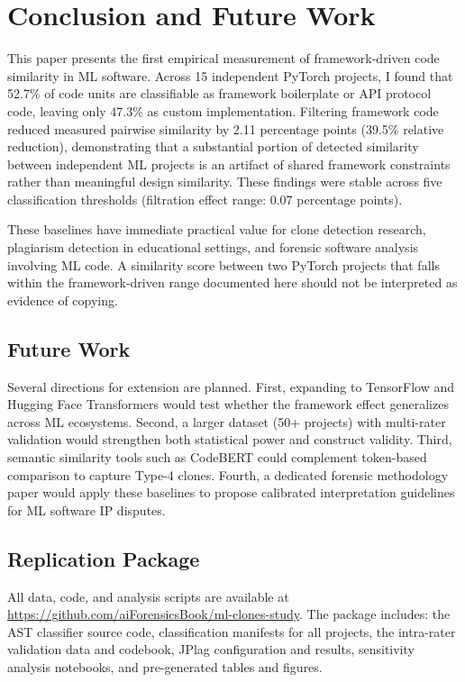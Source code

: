 \documentclass[smallextended,natbib]{svjour3}
\begin{document}
\section{Conclusion and Future Work}
\label{sec:conclusion}

This paper presents the first empirical measurement of framework-driven code similarity in ML software. Across 15 independent PyTorch projects, I found that 52.7\% of code units are classifiable as framework boilerplate or API protocol code, leaving only 47.3\% as custom implementation. Filtering framework code reduced measured pairwise similarity by 2.11 percentage points (39.5\% relative reduction), demonstrating that a substantial portion of detected similarity between independent ML projects is an artifact of shared framework constraints rather than meaningful design similarity. These findings were stable across five classification thresholds (filtration effect range: 0.07 percentage points).

These baselines have immediate practical value for clone detection research, plagiarism detection in educational settings, and forensic software analysis involving ML code. A similarity score between two PyTorch projects that falls within the framework-driven range documented here should not be interpreted as evidence of copying.

\subsection{Future Work}

Several directions for extension are planned. First, expanding to TensorFlow and Hugging Face Transformers would test whether the framework effect generalizes across ML ecosystems. Second, a larger dataset (50+ projects) with multi-rater validation would strengthen both statistical power and construct validity. Third, semantic similarity tools such as CodeBERT could complement token-based comparison to capture Type-4 clones. Fourth, a dedicated forensic methodology paper would apply these baselines to propose calibrated interpretation guidelines for ML software IP disputes.

\subsection{Replication Package}

All data, code, and analysis scripts are available at \url{https://github.com/aiForensicsBook/ml-clones-study}. The package includes: the AST classifier source code, classification manifests for all projects, the intra-rater validation data and codebook, JPlag configuration and results, sensitivity analysis notebooks, and pre-generated tables and figures.
\end{document}
